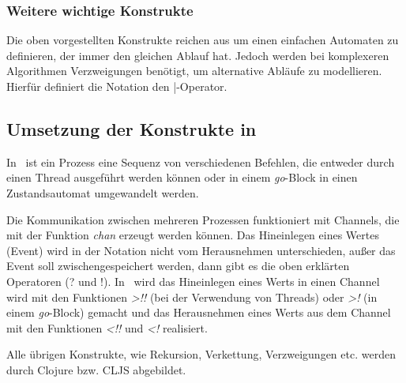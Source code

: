 
\subsubsection{Weitere wichtige Konstrukte}
Die oben vorgestellten Konstrukte reichen aus um einen einfachen Automaten zu definieren, der immer den gleichen Ablauf hat. Jedoch werden bei komplexeren Algorithmen Verzweigungen benötigt, um alternative Abläufe zu modellieren. Hierfür definiert die Notation den |-Operator.

\subsection{Umsetzung der Konstrukte in \CA}
In \CA\ ist ein Prozess eine Sequenz von verschiedenen Befehlen, die entweder durch einen Thread ausgeführt werden können oder in einem \textit{go}-Block in einen Zustandsautomat umgewandelt werden.

Die Kommunikation zwischen mehreren Prozessen funktioniert mit Channels, die mit der Funktion \textit{chan} erzeugt werden können. Das Hineinlegen eines Wertes (Event) wird in der Notation nicht vom Herausnehmen unterschieden, außer das Event soll zwischengespeichert werden, dann gibt es die oben erklärten Operatoren (? und !). In \CA\ wird das Hineinlegen eines Werts in einen Channel wird mit den Funktionen \textit{>!!} (bei der Verwendung von Threads) oder \textit{>!} (in einem \textit{go}-Block) gemacht und das Herausnehmen eines Werts aus dem Channel mit den Funktionen \textit{<!!} und \textit{<!} realisiert.

Alle übrigen Konstrukte, wie Rekursion, Verkettung, Verzweigungen etc. werden durch Clojure bzw. \acl{CLJS} abgebildet.